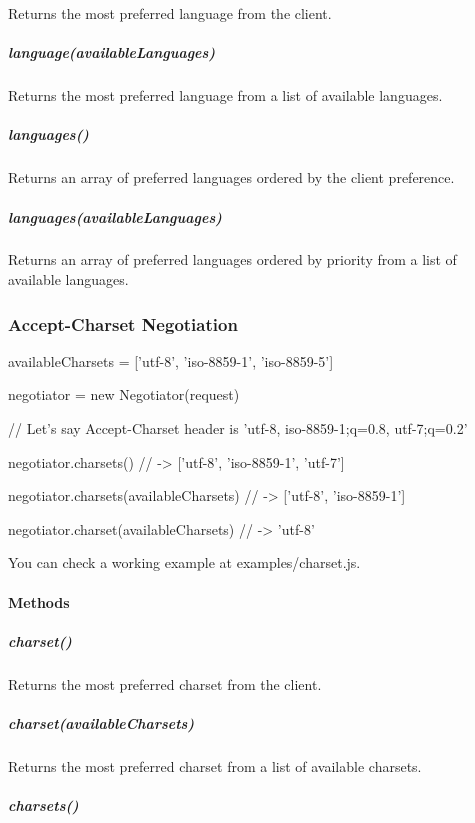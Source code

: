 Returns the most preferred language from the client.

\subparagraph*{language(available\+Languages)}

Returns the most preferred language from a list of available languages.

\subparagraph*{languages()}

Returns an array of preferred languages ordered by the client preference.

\subparagraph*{languages(available\+Languages)}

Returns an array of preferred languages ordered by priority from a list of available languages.

\subsubsection*{Accept-\/\+Charset Negotiation}


\begin{DoxyCode}
availableCharsets = [\textcolor{stringliteral}{'utf-8'}, \textcolor{stringliteral}{'iso-8859-1'}, \textcolor{stringliteral}{'iso-8859-5'}]

negotiator = \textcolor{keyword}{new} Negotiator(request)

\textcolor{comment}{// Let's say Accept-Charset header is 'utf-8, iso-8859-1;q=0.8, utf-7;q=0.2'}

negotiator.charsets()
\textcolor{comment}{// -> ['utf-8', 'iso-8859-1', 'utf-7']}

negotiator.charsets(availableCharsets)
\textcolor{comment}{// -> ['utf-8', 'iso-8859-1']}

negotiator.charset(availableCharsets)
\textcolor{comment}{// -> 'utf-8'}
\end{DoxyCode}


You can check a working example at {\ttfamily examples/charset.\+js}.

\paragraph*{Methods}

\subparagraph*{charset()}

Returns the most preferred charset from the client.

\subparagraph*{charset(available\+Charsets)}

Returns the most preferred charset from a list of available charsets.

\subparagraph*{charsets()}


